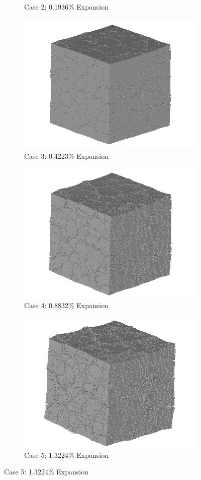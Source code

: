 \begin{figure}[!h]
\begin{subfigure}{.5\textwidth}
    \caption{Case 2: 0.1936\% Expansion}
    \end{subfigure}%
    \begin{subfigure}{.5\textwidth}
      \centering
      \includegraphics[width=.8\linewidth]{Files/exp_3D/ASR/A30P75_3_3d.png}
    \caption{Case 3: 0.4223\% Expansion}
    \end{subfigure}
    \begin{subfigure}{.5\textwidth}
      \centering
      \includegraphics[width=.8\linewidth]{Files/exp_3D/ASR/A30P75_4_3d.png}
    \caption{Case 4: 0.8832\% Expansion}
    \end{subfigure}%
    \begin{subfigure}{.5\textwidth}
      \centering
      \includegraphics[width=.8\linewidth]{Files/exp_3D/ASR/A30P75_5_3d.png}
    \caption{Case 5: 1.3224\% Expansion}
    \end{subfigure}


\end{figure}
